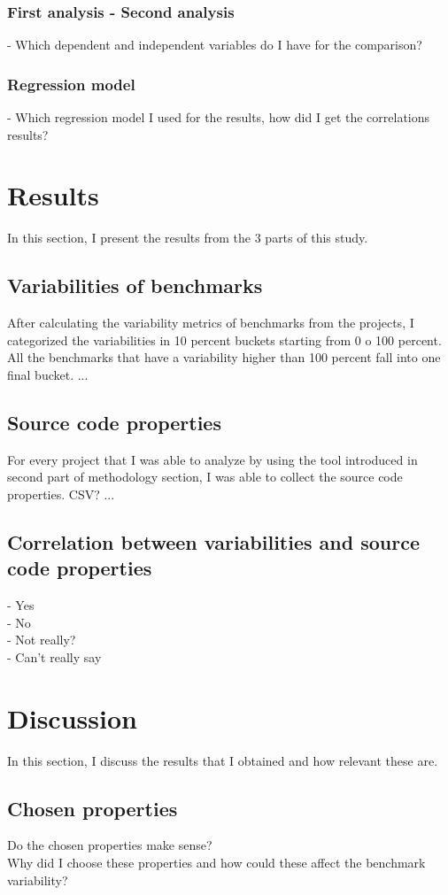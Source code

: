 \documentclass{seal_thesis}
\begin{document}
\subsection{First analysis - Second analysis}
- Which dependent and independent variables do I have for the comparison?
\subsection{Regression model}
- Which regression model I used for the results, how did I get the correlations results?

\chapter{Results}
In this section, I present the results from the 3 parts of this study. 
\section{Variabilities of benchmarks}
After calculating the variability metrics of benchmarks from the projects, I categorized the variabilities in 10 percent buckets starting from 0 o 100 percent. All the benchmarks that have a variability higher than 100 percent fall into one final bucket. ...

\section{Source code properties}
For every project that I was able to analyze by using the tool introduced in second part of methodology section, I was able to collect the source code properties. CSV? ...

\section{Correlation between variabilities and source code properties}
- Yes \\
- No \\
- Not really? \\
- Can't really say \\



\chapter{Discussion}
In this section, I discuss the results that I obtained and how relevant these are.
\section{Chosen properties}
Do the chosen properties make sense? \\
Why did I choose these properties and how could these affect the benchmark variability? \\
\end{document}
